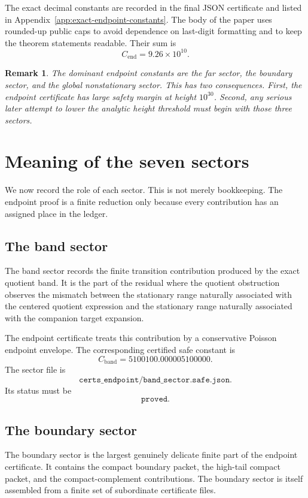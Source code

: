 \documentclass[11pt]{article}
\newtheorem{remark}[theorem]{Remark}
\newcommand{\Cend}{C_{\mathrm{end}}}
\begin{document}
The exact decimal constants are recorded in the final JSON certificate and
listed in Appendix~\ref{app:exact-endpoint-constants}.  The body of the paper
uses rounded-up public caps to avoid dependence on last-digit formatting and to
keep the theorem statements readable.
Their sum is
\[
\Cend
=
9.26\times10^{10}.
\]

\begin{remark}
The dominant endpoint constants are the far sector, the boundary sector, and the global nonstationary sector.  This has two consequences.  First, the endpoint certificate has large safety margin at height \(10^{30}\).  Second, any serious later attempt to lower the analytic height threshold must begin with those three sectors.
\end{remark}

\section{Meaning of the seven sectors}

We now record the role of each sector.  This is not merely bookkeeping.  The endpoint proof is a finite reduction only because every contribution has an assigned place in the ledger.

\subsection{The band sector}

The band sector records the finite transition contribution produced by the exact quotient band.  It is the part of the residual where the quotient obstruction observes the mismatch between the stationary range naturally associated with the centered quotient expression and the stationary range naturally associated with the companion target expansion.

The endpoint certificate treats this contribution by a conservative Poisson endpoint envelope.  The corresponding certified safe constant is
\[
C_{\mathrm{band}}
=
5100100.000005100000.
\]
The sector file is
\[
\texttt{certs\_endpoint/band\_sector.safe.json}.
\]
Its status must be
\[
\texttt{proved}.
\]

\subsection{The boundary sector}

The boundary sector is the largest genuinely delicate finite part of the endpoint certificate.  It contains the compact boundary packet, the high-tail compact packet, and the compact-complement contributions.  The boundary sector is itself assembled from a finite set of subordinate certificate files.
\end{document}
